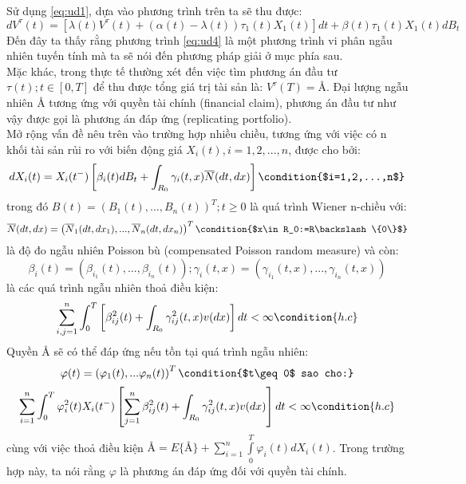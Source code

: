 \documentclass[a4paper]{article}
\numberwithin{equation}{section}
\begin{document}
Sử dụng \eqref{eq:ud1}, dựa vào phương trình trên ta sẽ thu được:
\begin{equation}\label{eq:ud4}
	dV^\tau(t)=[\lambda(t)V^\tau(t)+(\alpha(t)-\lambda(t))\tau_1(t)X_1(t)]dt +\beta(t)\tau_1(t)X_1(t)dB_t
\end{equation}
Đến đây ta thấy rằng phương trình \eqref{eq:ud4} là một phương trình vi phân ngẫu nhiên tuyến tính mà ta sẽ nói đến phương pháp giải ở mục phía sau.\\
Mặc khác, trong thực tế thường xét đến việc tìm phương án đầu tư $\tau(t);t\in[0,T]$ để thu được tổng giá trị tài sản là: $V^\tau(T)=\text{\AA}$. Đại lượng ngẫu nhiên $\text{\AA}$ tương ứng với quyền tài chính (financial claim), phương án đầu tư như vậy được gọi là phương án đáp ứng (replicating portfolio).\\
Mở rộng vấn đề nêu trên vào trường hợp nhiều chiều, tương ứng với việc có n khối tài sản rủi ro với biến động giá $X_i(t),i=1,2,...,n$, được cho bởi:
\begin{equation}\label{eq:ud5}
	dX_i(t)=X_i(t^-)\left[\beta_i(t)dB_t+\int_{R_0}\gamma_i(t,x)\overline{N}(dt,dx) \right] \condition{$i=1,2,...,n$}
\end{equation}
trong đó $B(t)=(B_1(t),...,B_n(t))^T;t\geq 0$ là quá trình Wiener n-chiều với:
\begin{equation*}
	\overline{N}(dt,dx)=\left(\overline{N}_1(dt,dx_1),...,\overline{N}_n(dt,dx_n)\right)^T \condition{$x\in R_0:=R\backslash\{0\}$}
\end{equation*}
là độ đo ngẫu nhiên Poisson bù (compensated Poisson random measure) và còn:
\begin{equation*}
	\beta_i(t)=(\beta_{i_1}(t),...,\beta_{i_n}(t));\gamma_i(t,x)=(\gamma_{i_1}(t,x),...,\gamma_{i_n}(t,x))
\end{equation*}
là các quá trình ngẫu nhiên thoả điều kiện:
\begin{equation*}
	\sum_{i,j=1}^{n}\int_{0}^{T}\left[\beta_{ij}^2(t)+\int_{R_0}\gamma_{ij}^2(t,x)v(dx) \right]dt<\infty \condition{h.c}
\end{equation*}
Quyền $\text{\AA}$ sẽ có thể đáp ứng nếu tồn tại quá trình ngẫu nhiên:
\begin{equation*}
	\varphi(t)=\left(\varphi_1(t),...\varphi_n(t) \right)^T \condition{$t\geq 0$ sao cho:}\\
\end{equation*}
\begin{equation*}
	\sum_{i=1}^{n}\int_{0}^{T}\varphi_i^2(t)X_i(t^-)\left[\sum_{j=1}^{n}\beta_{ij}^2(t)+\int_{R_0}\gamma_{ij}^2(t,x)v(dx) \right]dt<\infty \condition{h.c}
\end{equation*}
cùng với việc thoả điều kiện $\text{\AA}=E\{\text{\AA}\}+\sum\limits_{i=1}^{n}\int\limits_{0}^{T}\varphi_i(t)dX_i(t)$. Trong trường hợp này, ta nói rằng $\varphi$ là phương án đáp ứng đối với quyền tài chính.\\
\end{document}
